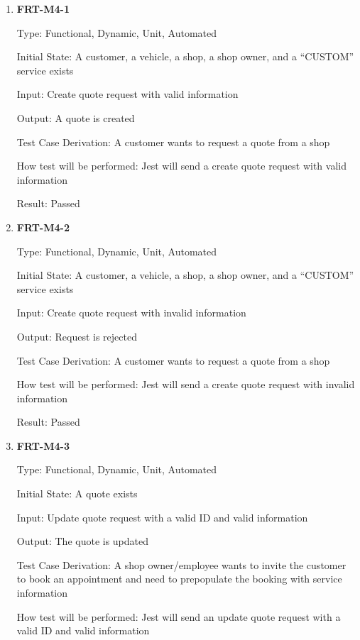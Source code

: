 \documentclass[12pt, titlepage]{article}
\begin{document}
\begin{enumerate}

	\item \textbf{FRT-M4-1}

	      Type: Functional, Dynamic, Unit, Automated

	      Initial State: A customer, a vehicle, a shop, a shop owner, and a ``CUSTOM'' service exists

	      Input: Create quote request with valid information

	      Output: A quote is created

	      Test Case Derivation: A customer wants to request a quote from a shop

	      How test will be performed: Jest will send a create quote request with valid information

	      Result: Passed

	\item \textbf{FRT-M4-2}

	      Type: Functional, Dynamic, Unit, Automated

	      Initial State: A customer, a vehicle, a shop, a shop owner, and a ``CUSTOM'' service exists

	      Input: Create quote request with invalid information

	      Output: Request is rejected

	      Test Case Derivation: A customer wants to request a quote from a shop

	      How test will be performed: Jest will send a create quote request with invalid information

	      Result: Passed

	\item \textbf{FRT-M4-3}

	      Type: Functional, Dynamic, Unit, Automated

	      Initial State: A quote exists

	      Input: Update quote request with a valid ID and valid information

	      Output: The quote is updated

	      Test Case Derivation: A shop owner/employee wants to invite the customer to book an appointment and
	      need to prepopulate the booking with service information

	      How test will be performed: Jest will send an update quote request with a valid ID and valid
	      information


\end{enumerate}
\end{document}
